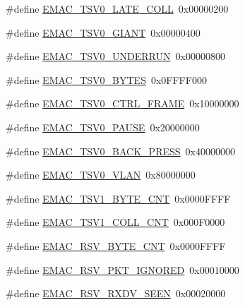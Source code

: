 \begin{DoxyCompactItemize}
\item 
\#define \hyperlink{group___e_m_a_c___private___macros_ga932dcfb3b88e07d8d0bf6031b965e3f3}{\-E\-M\-A\-C\-\_\-\-T\-S\-V0\-\_\-\-L\-A\-T\-E\-\_\-\-C\-O\-L\-L}~0x00000200
\item 
\#define \hyperlink{group___e_m_a_c___private___macros_gaba57c4751bb951ee3d3365d034c7df66}{\-E\-M\-A\-C\-\_\-\-T\-S\-V0\-\_\-\-G\-I\-A\-N\-T}~0x00000400
\item 
\#define \hyperlink{group___e_m_a_c___private___macros_ga3da8ac245f3b0f8e507064b8c48fac66}{\-E\-M\-A\-C\-\_\-\-T\-S\-V0\-\_\-\-U\-N\-D\-E\-R\-R\-U\-N}~0x00000800
\item 
\#define \hyperlink{group___e_m_a_c___private___macros_ga2ec441eed63c9013936f96e46cae4388}{\-E\-M\-A\-C\-\_\-\-T\-S\-V0\-\_\-\-B\-Y\-T\-E\-S}~0x0\-F\-F\-F\-F000
\item 
\#define \hyperlink{group___e_m_a_c___private___macros_ga556c1d349f2a9e23aabbeea1c26250f2}{\-E\-M\-A\-C\-\_\-\-T\-S\-V0\-\_\-\-C\-T\-R\-L\-\_\-\-F\-R\-A\-M\-E}~0x10000000
\item 
\#define \hyperlink{group___e_m_a_c___private___macros_ga846ab8f1881a030257dfdfbe8cc3a184}{\-E\-M\-A\-C\-\_\-\-T\-S\-V0\-\_\-\-P\-A\-U\-S\-E}~0x20000000
\item 
\#define \hyperlink{group___e_m_a_c___private___macros_ga8ccf5a1be51b8d7722c9c24ef22e8e0a}{\-E\-M\-A\-C\-\_\-\-T\-S\-V0\-\_\-\-B\-A\-C\-K\-\_\-\-P\-R\-E\-S\-S}~0x40000000
\item 
\#define \hyperlink{group___e_m_a_c___private___macros_gaf1e506e9532610a8fc3abfd28172eacc}{\-E\-M\-A\-C\-\_\-\-T\-S\-V0\-\_\-\-V\-L\-A\-N}~0x80000000
\item 
\#define \hyperlink{group___e_m_a_c___private___macros_ga7ed41c4c409b06a0d533832382848cb1}{\-E\-M\-A\-C\-\_\-\-T\-S\-V1\-\_\-\-B\-Y\-T\-E\-\_\-\-C\-N\-T}~0x0000\-F\-F\-F\-F
\item 
\#define \hyperlink{group___e_m_a_c___private___macros_ga821a0b170ed975ecdb3065c802ccb631}{\-E\-M\-A\-C\-\_\-\-T\-S\-V1\-\_\-\-C\-O\-L\-L\-\_\-\-C\-N\-T}~0x000\-F0000
\item 
\#define \hyperlink{group___e_m_a_c___private___macros_ga9f84a9441653d7d72c1479e44d056e1f}{\-E\-M\-A\-C\-\_\-\-R\-S\-V\-\_\-\-B\-Y\-T\-E\-\_\-\-C\-N\-T}~0x0000\-F\-F\-F\-F
\item 
\#define \hyperlink{group___e_m_a_c___private___macros_ga1b90b9b75329bffc5763738325ce63a5}{\-E\-M\-A\-C\-\_\-\-R\-S\-V\-\_\-\-P\-K\-T\-\_\-\-I\-G\-N\-O\-R\-E\-D}~0x00010000
\item 
\#define \hyperlink{group___e_m_a_c___private___macros_gaa62e86e5b73c09657e603ff723f49a03}{\-E\-M\-A\-C\-\_\-\-R\-S\-V\-\_\-\-R\-X\-D\-V\-\_\-\-S\-E\-E\-N}~0x00020000

\end{DoxyCompactItemize}
